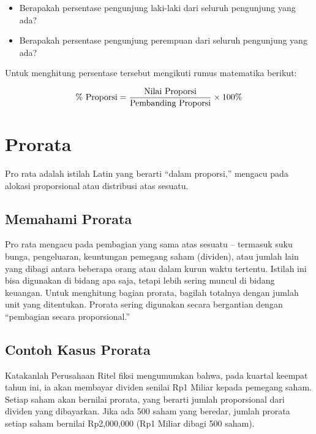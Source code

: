 \documentclass[
]{book}
\providecommand{\tightlist}{%
  \setlength{\itemsep}{0pt}\setlength{\parskip}{0pt}}
\begin{document}
\begin{itemize}
\tightlist
\item
  Berapakah persentase pengunjung laki-laki dari seluruh pengunjung yang ada?
\item
  Berapakah persentase pengunjung perempuan dari seluruh pengunjung yang ada?
\end{itemize}

Untuk menghitung persentase tersebut mengikuti rumus matematika berikut:

\[ \% \text{ Proporsi}  = {\text{Nilai Proporsi} \over \text{Pembanding Proporsi}} \times 100 \%\]

\hypertarget{prorata}{%
\section{Prorata}\label{prorata}}

Pro rata adalah istilah Latin yang berarti ``dalam proporsi,'' mengacu pada alokasi proporsional atau distribusi atas sesuatu.

\hypertarget{memahami-prorata}{%
\subsection{Memahami Prorata}\label{memahami-prorata}}

Pro rata mengacu pada pembagian yang sama atas sesuatu -- termasuk suku bunga, pengeluaran, keuntungan pemegang saham (dividen), atau jumlah lain yang dibagi antara beberapa orang atau dalam kurun waktu tertentu. Istilah ini bisa digunakan di bidang apa saja, tetapi lebih sering muncul di bidang keuangan. Untuk menghitung bagian prorata, bagilah totalnya dengan jumlah unit yang ditentukan. Prorata sering digunakan secara bergantian dengan ``pembagian secara proporsional.''

\hypertarget{contoh-kasus-prorata}{%
\subsection{Contoh Kasus Prorata}\label{contoh-kasus-prorata}}

Katakanlah Perusahaan Ritel fiksi mengumumkan bahwa, pada kuartal keempat tahun ini, ia akan membayar dividen senilai Rp1 Miliar kepada pemegang saham. Setiap saham akan bernilai prorata, yang berarti jumlah proporsional dari dividen yang dibayarkan. Jika ada 500 saham yang beredar, jumlah prorata setiap saham bernilai Rp2,000,000 (Rp1 Miliar dibagi 500 saham).
\end{document}
